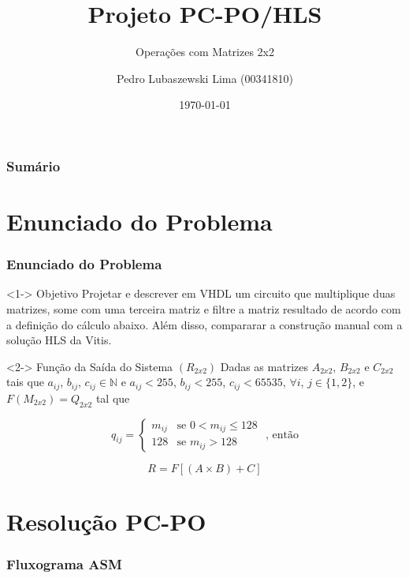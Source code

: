 \documentclass{beamer}
\title[Projeto PC-PO/HLS]{Projeto PC-PO/HLS}
\subtitle{Operações com Matrizes 2x2}
\author[Pedro Lubaszewski Lima]{Pedro Lubaszewski Lima (00341810)}
\institute[]{INF01175\\Sistemas Digitais para Computadores A}
\date[\today]{\today}
\begin{document}
    \begin{frame}
        \maketitle
    \end{frame}

    \begin{frame}
        \frametitle{Sumário}
        \tableofcontents
    \end{frame}

    \section{Enunciado do Problema}
    \begin{frame}
        \frametitle{Enunciado do Problema}

        \begin{block}<1->
            {Objetivo}
            Projetar e descrever em VHDL um
            circuito que multiplique duas matrizes,
            some com uma terceira matriz e filtre a
            matriz resultado de acordo com a definição
            do cálculo abaixo. Além disso, compararar
            a construção manual com a solução HLS da
            Vitis.
        \end{block}

        \begin{block}<2->
            {Função da Saída do Sistema $ (R_{2x2}) $}
            Dadas as matrizes $ A_{2x2} $, $ B_{2x2} $
            e $ C_{2x2} $ tais que $ a_{ij} $, $ b_{ij} $,
            $ c_{ij} \in \mathbb{N} $ e $ a_{ij} < 255 $,
            $ b_{ij} < 255 $, $ c_{ij} < 65535 $, $ \forall i $,
            $ j \in \{ 1,2 \}$, e $ F(M_{2x2}) = Q_{2x2} $ tal que

            $$ q_{ij} = 
                \begin{cases}
                    m_{ij} & \text{se } 0 < m_{ij} \leqslant 128 \\
                    128 & \text{se } m_{ij} > 128
                \end{cases}
                \text{ , então}
            $$

            $$ R = F[(A \times B) + C] $$
        \end{block}
    \end{frame}

    \section{Resolução PC-PO}
    \begin{frame}
        \frametitle{Fluxograma ASM}
    \end{frame}
\end{document}
